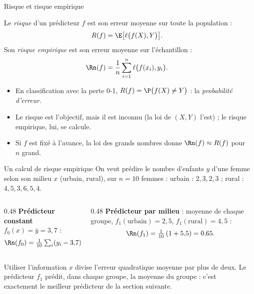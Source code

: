 \documentclass[aspectratio=169,11pt]{beamer}
\begin{document}
\begin{frame}{Risque et risque empirique}
  \begin{definition}
    Le \emph{risque} d'un prédicteur $f$ est son erreur moyenne sur toute la population :
    \[
      R(f)=\E\big[\ell\big(f(X),Y\big)\big].
    \]
    Son \emph{risque empirique} est son erreur moyenne sur l'échantillon :
    \[
      \Rn(f)=\frac1n\sum_{i=1}^n\ell\big(f(x_i),y_i\big).
    \]
  \end{definition}
  \begin{itemize}\small
    \item En classification avec la perte 0-1, $R(f)=\P\big(f(X)\ne Y\big)$ : la \emph{probabilité d'erreur}.
    \item Le risque est l'objectif, mais il est inconnu (la loi de $(X,Y)$ l'est) ; le risque empirique, lui, se calcule.
    \item Si $f$ est fixé à l'avance, la loi des grands nombres donne $\Rn(f)\approx R(f)$ pour $n$ grand.
  \end{itemize}
\end{frame}

\begin{frame}{Un calcul de risque empirique}
  \small
  On veut prédire le nombre d'enfants $y$ d'une femme selon son milieu $x$ (urbain, rural), sur $n=10$ femmes :
  urbain : $2,3,2,3$ ; rural : $4,5,3,6,5,4$.
  \vskip2mm
  \begin{columns}[T]
    \begin{column}{0.48\textwidth}
      \textbf{Prédicteur constant} $f_0(x)=\bar y=3{,}7$ :
      \[
        \Rn(f_0)=\tfrac{1}{10}\textstyle\sum_i(y_i-3{,}7)^2=1{,}61 .
      \]
    \end{column}
    \begin{column}{0.48\textwidth}
      \textbf{Prédicteur par milieu} : moyenne de chaque groupe,
      $f_1(\text{urbain})=2{,}5$, $f_1(\text{rural})=4{,}5$ :
      \[
        \Rn(f_1)=\tfrac{1}{10}\,(1+5{,}5)=0{,}65 .
      \]
    \end{column}
  \end{columns}
  \vskip3mm
  \begin{remarque}[Lecture]
    Utiliser l'information $x$ divise l'erreur quadratique moyenne par plus de deux.
    Le prédicteur $f_1$ prédit, dans chaque groupe, la moyenne du groupe : c'est exactement le meilleur prédicteur de la section suivante.
  \end{remarque}
\end{frame}
\end{document}
